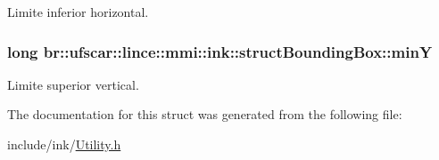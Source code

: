Limite inferior horizontal. 

\hypertarget{structbr_1_1ufscar_1_1lince_1_1mmi_1_1ink_1_1structBoundingBox_a45f3a13363b8016024e8ccc5c39eae70}{
\subsubsection[{minY}]{\setlength{\rightskip}{0pt plus 5cm}long {\bf br::ufscar::lince::mmi::ink::structBoundingBox::minY}}}
\label{structbr_1_1ufscar_1_1lince_1_1mmi_1_1ink_1_1structBoundingBox_a45f3a13363b8016024e8ccc5c39eae70}


Limite superior vertical. 



The documentation for this struct was generated from the following file:\begin{DoxyCompactItemize}
\item 
include/ink/\hyperlink{Utility_8h}{Utility.h}\end{DoxyCompactItemize}
